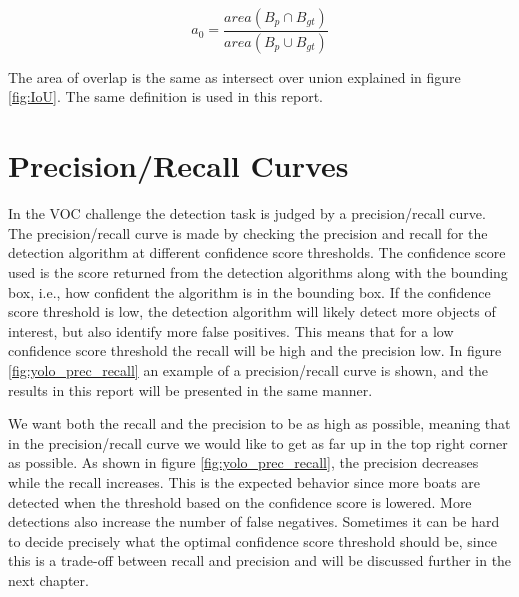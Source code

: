 \begin{equation*}
    a_0 = \frac{area(B_p \cap B_{gt}) }{area(B_p \cup B_{gt})}
\end{equation*}

The area of overlap is the same as intersect over union explained in figure \ref{fig:IoU}. The same definition is used in this report.




\section{Precision/Recall Curves}

In the VOC challenge \citep{Everinghama} the detection task is judged by a precision/recall curve. The precision/recall curve is made by checking the precision and recall for the detection algorithm at different confidence score thresholds. The confidence score used is the score returned from the detection algorithms along with the bounding box, i.e., how confident the algorithm is in the bounding box. If the confidence score threshold is low, the detection algorithm will likely detect more objects of interest, but also identify more false positives. This means that for a low confidence score threshold the recall will be high and the precision low. In figure \ref{fig:yolo_prec_recall} an example of a precision/recall curve is shown, and the results in this report will be presented in the same manner. 

\vspace{3mm}

We want both the recall and the precision to be as high as possible, meaning that in the precision/recall curve we would like to get as far up in the top right corner as possible. As shown in figure \ref{fig:yolo_prec_recall}, the precision decreases while the recall increases. This is the expected behavior since more boats are detected when the threshold based on the confidence score is lowered. More detections also increase the number of false negatives. Sometimes it can be hard to decide precisely what the optimal confidence score threshold should be, since this is a trade-off between recall and precision and will be discussed further in the next chapter. 

